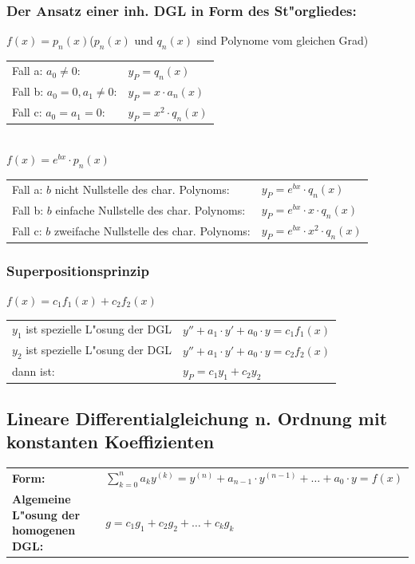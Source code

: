 \subsubsection{Der Ansatz einer inh. DGL in Form des
St"orgliedes:\quad{}} $f(x)=p_n(x)$\hspace{9cm}($p_n(x)$
und $q_n(x)$ sind Polynome vom gleichen Grad)\\
\begin{tabular}{p{8cm}p{4cm}}
Fall a: $a_0\neq 0$:          & $y_P = q_n(x)$\\
Fall b: $a_0 = 0 , a_1\neq 0$:& $y_P=x\cdot a_n(x)$\\
Fall c: $a_0=a_1=0$:          & $y_P=x^2\cdot q_n(x)$\\
\end{tabular}\\
$f(x)=e^{bx}\cdot p_n(x)$\\
\begin{tabular}{p{8cm}p{4cm}}
Fall a: $b$ nicht Nullstelle des char. Polynoms:    &
$y_P=e^{bx}\cdot q_n(x)$\\
Fall b: $b$ einfache Nullstelle des char. Polynoms: &
$y_P=e^{bx}\cdot x \cdot q_n(x)$\\
Fall c: $b$ zweifache Nullstelle des char. Polynoms:&
$y_P=e^{bx}\cdot x^2\cdot q_n(x)$\\
\end{tabular}



\subsubsection{Superpositionsprinzip}
$f(x)=c_1f_1(x)+c_2f_2(x)$\\
\begin{tabular}{p{8cm}p{4cm}}
$y_1$ ist spezielle L"osung der DGL &
$y''+a_1\cdot y'+a_0\cdot y=c_1f_1(x)$ \\
$y_2$ ist spezielle L"osung der DGL &
$y''+a_1\cdot y'+a_0\cdot y=c_2f_2(x)$ \\
dann ist:                          &
$y_P=c_1y_1+c_2y_2$\\
\end{tabular}

\subsection{Lineare Differentialgleichung n. Ordnung mit konstanten 
Koeffizienten }
\begin{tabular}{p{8cm}p{8cm}}
\textbf{Form:} &
$\sum\limits_{k=0}^na_ky^{(k)}= y^{(n)}+a_{n-1}\cdot y^{(n-1)}+\ldots +a_0\cdot y=f(x)$\\
\textbf{Algemeine L"osung der homogenen DGL:} &
$g=c_1g_1+c_2g_2+\ldots +c_kg_k$\\
\end{tabular}

